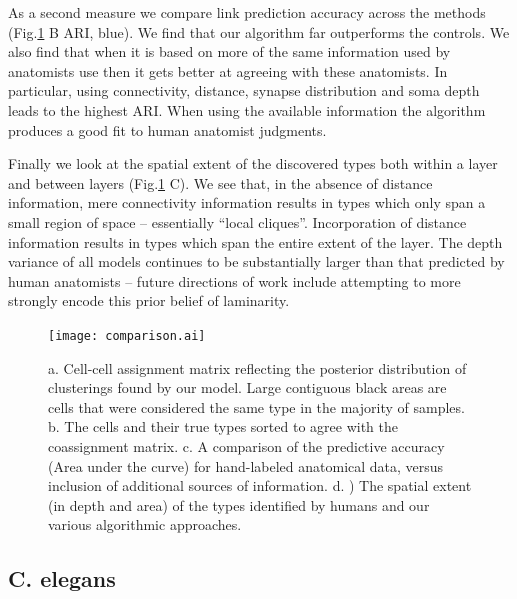 \documentclass{article}
\begin{document}
As a second measure we compare link prediction accuracy across the
methods (Fig.\ref{fig:mouseretina_compare} B ARI, blue). We find that our
algorithm far outperforms the controls. We also find that when it is
based on more of the same information used by anatomists use then it
gets better at agreeing with these anatomists. In particular, using
connectivity, distance, synapse distribution and soma depth leads to
the highest ARI. When using the available information the algorithm
produces a good fit to human anatomist judgments.

Finally we look at the spatial extent of the discovered types both
within a layer and between layers (Fig.\ref{fig:mouseretina_compare}
C). We see that, in the absence of distance information, mere
connectivity information results in types which only span a small
region of space -- essentially “local cliques”. Incorporation of
distance information results in types which span the entire extent of
the layer. The depth variance of all models continues to be
substantially larger than that predicted by human anatomists -- future
directions of work include attempting to more strongly encode this
prior belief of laminarity.


\begin{figure}
  \centering 
  \centerline{\texttt{[image: comparison.ai]}}
  \caption{a. Cell-cell assignment matrix reflecting the posterior
    distribution of clusterings found by our model. Large contiguous
    black areas are cells that were considered the same type in the
    majority of samples. b. The cells and their true types sorted to
    agree with the coassignment matrix. c. A comparison of the
    predictive accuracy (Area under the curve) for hand-labeled
    anatomical data, versus inclusion of additional sources of
    information. d. ) The spatial extent (in depth and area) of the
    types identified by humans and our various algorithmic
    approaches.}

\label{fig:mouseretina_compare}
\end{figure}



\subsection{C. elegans}
\end{document}
